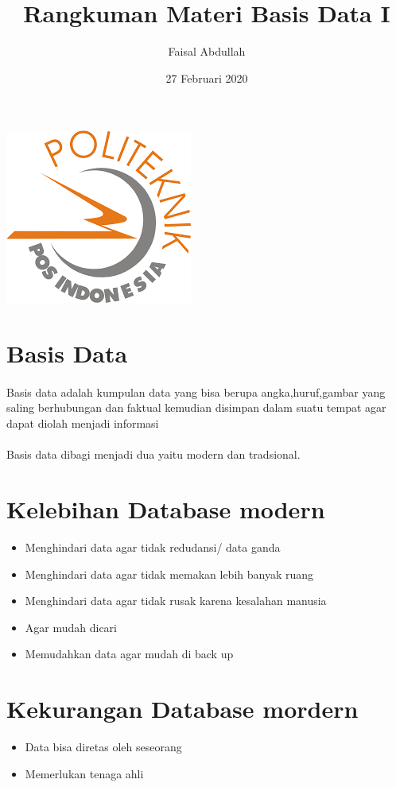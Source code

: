 \documentclass[10pt]{article}
\title{Rangkuman Materi Basis Data I}
\author{Faisal Abdullah }
\date{27 Februari 2020  }
\begin{document}
\maketitle
\begin{center}
    \includegraphics[]{download.png}
\end{center}

\newpage

\section*{Basis Data}
\paragraph{}Basis data adalah kumpulan data yang bisa berupa angka,huruf,gambar yang saling berhubungan dan faktual kemudian disimpan dalam suatu tempat agar dapat diolah menjadi informasi
\paragraph{}Basis data dibagi menjadi dua yaitu modern dan tradsional.

\section*{Kelebihan Database modern}
\begin{itemize}
  \item Menghindari data agar tidak redudansi/ data ganda
  \item Menghindari data agar tidak memakan lebih banyak ruang
  \item Menghindari data agar tidak rusak karena kesalahan manusia
  \item Agar mudah dicari
  \item Memudahkan data agar mudah di back up
 \end{itemize}
 
  \section*{Kekurangan Database mordern}
\begin{itemize}
  \item Data bisa diretas oleh seseorang
  \item Memerlukan tenaga ahli
 \end{itemize}
 
\end{document}
